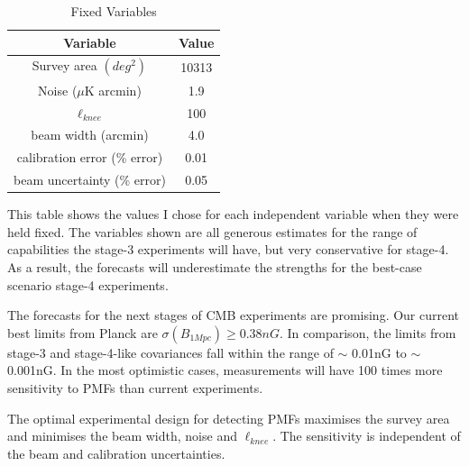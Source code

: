 \begin{table}[h]
\centering
\caption{Fixed Variables}

\label{table: fixed-stats}
\begin{tabular}{l|l}
\multicolumn{1}{c}{Variable} & \multicolumn{1}{|c}{Value} \\ \hline
\multicolumn{1}{c}{Survey area $(deg^2)$} & \multicolumn{1}{|c}{10313}  \\
\multicolumn{1}{c}{Noise ($\mu$K arcmin)} & \multicolumn{1}{|c}{1.9}   \\
\multicolumn{1}{c}{$\ell_{knee}$} & \multicolumn{1}{|c}{100} \\
\multicolumn{1}{c}{beam width (arcmin)} & \multicolumn{1}{|c}{4.0}   \\
\multicolumn{1}{c}{calibration error (\% error)} & \multicolumn{1}{|c}{0.01} \\
\multicolumn{1}{c}{beam uncertainty (\% error)} & \multicolumn{1}{|c}{0.05}
\end{tabular}
\begin{flushleft}
This table shows the values I chose for each independent variable when they were held fixed. The variables shown are all generous estimates for the range of capabilities the stage-3 experiments will have, but very conservative for stage-4. As a result, the forecasts will underestimate the strengths for the best-case scenario stage-4 experiments.
\end{flushleft}
\end{table}

The forecasts for the next stages of CMB experiments are promising. Our current best limits from Planck are $\sigma(B_{1Mpc}) \geq 0.38nG$. In comparison, the limits from stage-3 and stage-4-like covariances fall within the range of $\sim$ 0.01nG to $\sim$ 0.001nG. In the most optimistic cases, measurements will have 100 times more sensitivity to PMFs than current experiments.

The optimal experimental design for detecting PMFs maximises the survey area and minimises the beam width, noise and $\ell_{knee}$. The sensitivity is independent of the beam and calibration uncertainties. 

